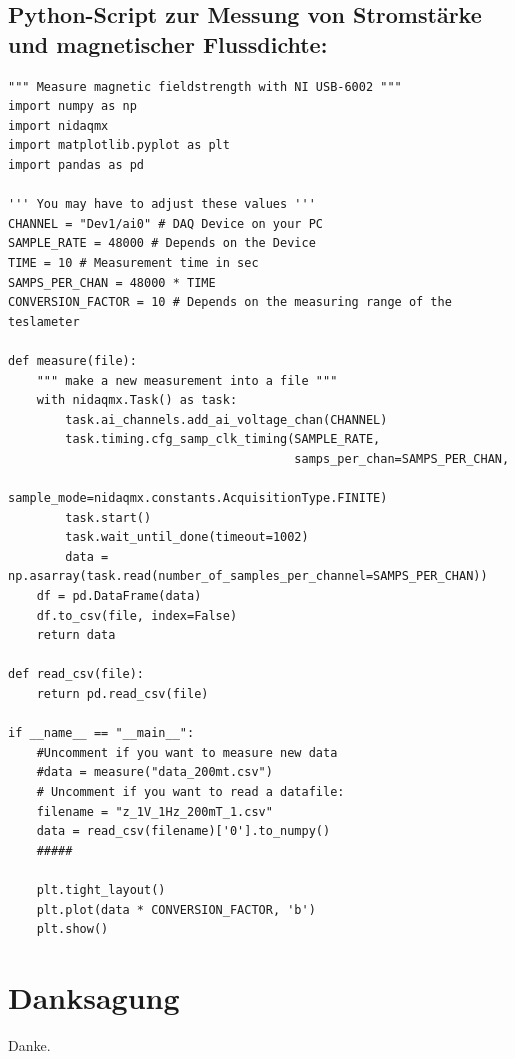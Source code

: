\documentclass[page,pdftex,12pt,a4paper,twoside,openright]{scrbook}
\begin{document}
\section{Python-Script zur Messung von Stromstärke und magnetischer Flussdichte: \label{anh-messung}}
\label{sec:org7c1b0a3}
\begin{verbatim}
""" Measure magnetic fieldstrength with NI USB-6002 """
import numpy as np
import nidaqmx
import matplotlib.pyplot as plt
import pandas as pd

''' You may have to adjust these values '''
CHANNEL = "Dev1/ai0" # DAQ Device on your PC
SAMPLE_RATE = 48000 # Depends on the Device
TIME = 10 # Measurement time in sec
SAMPS_PER_CHAN = 48000 * TIME 
CONVERSION_FACTOR = 10 # Depends on the measuring range of the teslameter

def measure(file):
    """ make a new measurement into a file """
    with nidaqmx.Task() as task:
        task.ai_channels.add_ai_voltage_chan(CHANNEL)
        task.timing.cfg_samp_clk_timing(SAMPLE_RATE,
                                        samps_per_chan=SAMPS_PER_CHAN,
                                        sample_mode=nidaqmx.constants.AcquisitionType.FINITE)
        task.start()
        task.wait_until_done(timeout=1002)
        data = np.asarray(task.read(number_of_samples_per_channel=SAMPS_PER_CHAN))
    df = pd.DataFrame(data)
    df.to_csv(file, index=False)
    return data

def read_csv(file):
    return pd.read_csv(file)

if __name__ == "__main__":
    #Uncomment if you want to measure new data
    #data = measure("data_200mt.csv")
    # Uncomment if you want to read a datafile:
    filename = "z_1V_1Hz_200mT_1.csv"
    data = read_csv(filename)['0'].to_numpy()
    #####

    plt.tight_layout()
    plt.plot(data * CONVERSION_FACTOR, 'b')
    plt.show()
\end{verbatim}

\chapter*{}
\label{sec:org3d17650}
\printbibliography

\chapter*{Danksagung}
\label{sec:org9c6844b}
Danke.
\end{document}
